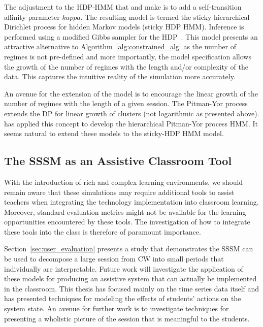 The adjustment to the HDP-HMM that \cite{fox2009nonparametric} and \cite{fox2007hierarchical} make is to add a self-transition affinity parameter $kappa$. The resulting model is termed the sticky hierarchical Dirichlet process for hidden Markov models (sticky HDP HMM). Inference is performed using a modified Gibbs sampler for the HDP~\cite{teh2005sharing}. This model presents an attractive alternative to Algorithm~\ref{alg:constrained_alg} as the number of regimes is not pre-defined and more importantly, the model specification allows the growth of the number of regimes with the length and/or complexity of the data. This captures the intuitive reality of the simulation more accurately.

An avenue for the extension of the \cite{fox2009nonparametric} model is to encourage the linear growth of the number of regimes with the length of a given session. The Pitman-Yor process~\citep{pitman1997two} extends the DP for linear growth of clusters (not logarithmic as presented above). \cite{blunsom2011hierarchical} has applied this concept to develop the hierarchical Pitman-Yor process HMM. It seems natural to extend these models to the \cite{fox2009nonparametric} sticky-HDP HMM model.

\subsection{The SSSM as an Assistive Classroom Tool}\label{sec:class-assistive}
With the introduction of rich and complex learning environments, we should remain aware that these simulations may require additional tools to assist teachers when integrating the technology implementation into classroom learning. Moreover, standard evaluation metrics might not be available for the learning opportunities encountered by these tools. The investigation of how to integrate these tools into the class is therefore of paramount importance.

Section~\ref{sec:user_evaluation} presents a study that demonstrates the SSSM can be used to decompose a large session from CW into small periods that individually are interpretable. Future work will investigate the application of these models for producing an assistive system that can actually be implemented in the classroom. This thesis has focused mainly on the time series data itself and has presented techniques for modeling the effects of students' actions on the system state. An avenue for further work is to investigate techniques for presenting a wholistic picture of the session that is meaningful to the students.

